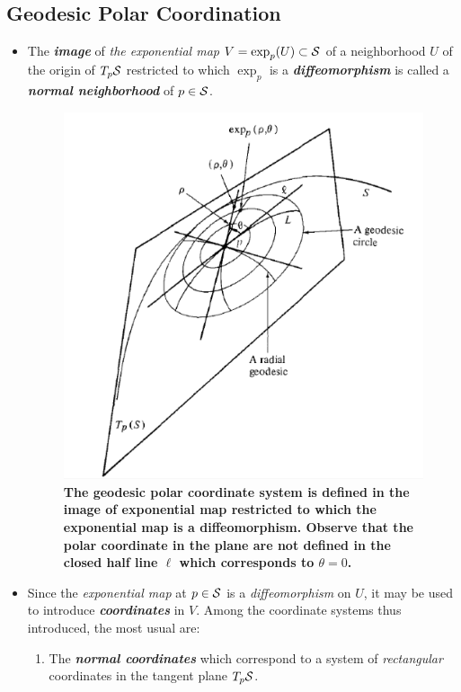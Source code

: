 \documentclass[11pt]{article}
\begin{document}
\subsection{Geodesic Polar Coordination}
\begin{itemize}
\item The \emph{\textbf{image}} of \emph{the exponential map} $V = \exp_{p}(U) \subset {\mathcal S}$ of a neighborhood $U$ of the origin of $T_{p}{\mathcal S}$ restricted to which $\exp_{p}$ is a \emph{\textbf{diffeomorphism}} is called a \emph{\textbf{normal neighborhood}} of $p\in {\mathcal S}$.

\begin{figure}[htb]
\centering
\begin{minipage}{0.6\linewidth}
 \centerline{\includegraphics[scale = 0.43]{geo_polar_coord.png}}
\end{minipage}
\caption{\scriptsize
\textbf{The geodesic polar coordinate system is defined in the image of exponential map restricted to which the exponential map is a diffeomorphism.  Observe that the polar coordinate in the plane are not defined in the closed half line $\ell$ which corresponds to $\theta=0$. }}
\label{fig: geo_polar_coord}
\end{figure}

\item Since the \emph{exponential map} at $p \in {\mathcal S}$ is a \emph{diffeomorphism} on $U$, it may be used to introduce \emph{\textbf{coordinates}} in $V$. Among the coordinate systems thus introduced, the most usual are:
\begin{enumerate}
\item The \emph{\textbf{normal coordinates}} which correspond to a system of \emph{rectangular} coordinates in the tangent plane $T_{p}{\mathcal S}$.


\end{enumerate}
\end{itemize}
\end{document}
